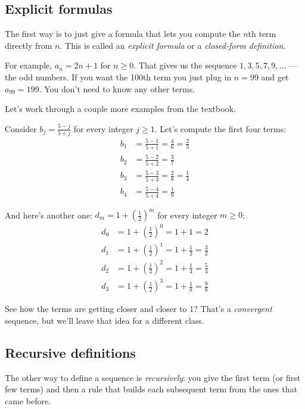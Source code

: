 \documentclass[11pt]{article}
\begin{document}
\subsection{Explicit formulas}
The first way is to just give a formula that lets you compute the $n$th term directly from $n$. This is called an \emph{explicit formula} or a \emph{closed-form definition}.

For example, $a_n = 2n + 1$ for $n \geq 0$. That gives us the sequence $1, 3, 5, 7, 9, \ldots$ --- the odd numbers. If you want the 100th term you just plug in $n = 99$ and get $a_{99} = 199$. You don't need to know any other terms.

Let's work through a couple more examples from the textbook.

Consider $b_j = \frac{5-j}{5+j}$ for every integer $j \geq 1$. Let's compute the first four terms:
\begin{align*}
b_1 &= \frac{5-1}{5+1} = \frac{4}{6} = \frac{2}{3} \\[4pt]
b_2 &= \frac{5-2}{5+2} = \frac{3}{7} \\[4pt]
b_3 &= \frac{5-3}{5+3} = \frac{2}{8} = \frac{1}{4} \\[4pt]
b_4 &= \frac{5-4}{5+4} = \frac{1}{9}
\end{align*}

And here's another one: $d_m = 1 + \left(\frac{1}{2}\right)^m$ for every integer $m \geq 0$:
\begin{align*}
d_0 &= 1 + \left(\tfrac{1}{2}\right)^0 = 1 + 1 = 2 \\[4pt]
d_1 &= 1 + \left(\tfrac{1}{2}\right)^1 = 1 + \tfrac{1}{2} = \tfrac{3}{2} \\[4pt]
d_2 &= 1 + \left(\tfrac{1}{2}\right)^2 = 1 + \tfrac{1}{4} = \tfrac{5}{4} \\[4pt]
d_3 &= 1 + \left(\tfrac{1}{2}\right)^3 = 1 + \tfrac{1}{8} = \tfrac{9}{8}
\end{align*}

See how the terms are getting closer and closer to 1? That's a \emph{convergent} sequence, but we'll leave that idea for a different class.

\subsection{Recursive definitions}
The other way to define a sequence is \emph{recursively}: you give the first term (or first few terms) and then a rule that builds each subsequent term from the ones that came before.
\end{document}
